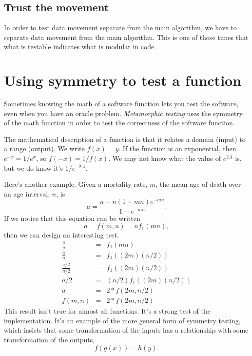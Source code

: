 \documentclass[fleqn,10pt]{olplainarticle}
\begin{document}
\subsection{Trust the movement}

In order to test data movement separate from the main algorithm,
we have to separate data movement from the main algorithm.
This is one of those times that what is testable indicates what
is modular in code.


\section{Using symmetry to test a function}

Sometimes knowing the math of a software function lets you
test the software, even when you have an oracle problem.
\emph{Metamorphic testing} uses the symmetry of the math function
in order to test the correctness of the software function.

The mathematical description of a function is that it relates
a domain (input) to a range (output). We write $f(x) = y$.
If the function is an exponential, then $e^{-x} = 1 / e^x$,
so $f(-x) = 1 / f(x)$. We may not know what the value of
$e^2.4$ is, but we do know it's $1 / e^{-2.4}$.

Here's another example. Given a mortality rate, $m$, the
mean age of death over an age interval, $n$, is
\begin{equation}
    a = \frac{n - n(1+m n)e^{-m n}}{1 - e^{-m n}}.
\end{equation}
If we notice that this equation can be written
\begin{equation}
    a = f(m, n) = n  f_1(m  n),
\end{equation}
then we can design an interesting test.
\begin{eqnarray}
    \frac{a}{n} &= &f_1(m  n) \\
    \frac{a}{n} &= & f_1((2  m)  (n / 2)) \\
    \frac{a/2}{n/2} &= & f_1((2  m)  (n / 2)) \\
    a /2 &= & (n/2) f_1((2  m)  (n / 2)) \\
    a &= &2 * f(2m, n/2) \\
    f(m, n) & =& 2 * f(2m, n/2)
\end{eqnarray}
This result isn't true for almost all functions. It's a strong test
of the implementation. It's an example of the more general
form of symmetry testing, which insists that some transformation
of the inputs has a relationship with some transformation of the 
outputs,
\begin{equation}
    f(g(x)) = h(y).
\end{equation}
\end{document}
